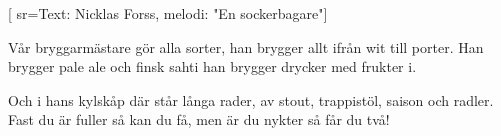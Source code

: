 [ 							
	sr={Text: Nicklas Forss, melodi: "En sockerbagare"}]		
	
\beginverse*						
Vår bryggarmästare gör alla sorter,
han brygger allt ifrån wit till porter.
Han brygger pale ale och finsk sahti
han brygger drycker med frukter i.
\endverse						

\beginverse				
Och i hans kylskåp där står långa rader,
av stout, trappistöl, saison och radler.
Fast du är fuller så kan du få,
men är du nykter så får du två!
\endverse				
\endsong	
